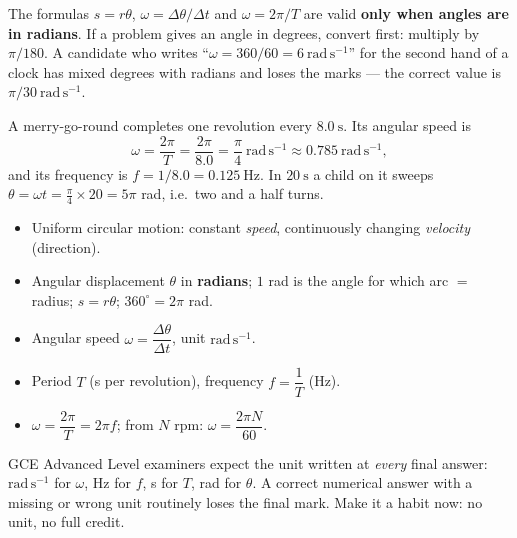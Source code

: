 \documentclass[11pt]{article}
\begin{document}
\begin{attention}
The formulas $s = r\theta$, $\omega = \Delta\theta/\Delta t$ and $\omega = 2\pi/T$ are valid \textbf{only when angles are in radians}. If a problem gives an angle in degrees, convert first: multiply by $\pi/180$. A candidate who writes ``$\omega = 360/60 = 6\ \mathrm{rad\,s^{-1}}$'' for the second hand of a clock has mixed degrees with radians and loses the marks — the correct value is $\pi/30\ \mathrm{rad\,s^{-1}}$.
\end{attention}

\begin{exemplebox}
A merry-go-round completes one revolution every $8.0\ \mathrm{s}$. Its angular speed is
\[
\omega = \frac{2\pi}{T} = \frac{2\pi}{8.0} = \frac{\pi}{4}\ \mathrm{rad\,s^{-1}} \approx 0.785\ \mathrm{rad\,s^{-1}},
\]
and its frequency is $f = 1/8.0 = 0.125\ \mathrm{Hz}$. In $20\ \mathrm{s}$ a child on it sweeps $\theta = \omega t = \frac{\pi}{4}\times 20 = 5\pi$ rad, i.e.\ two and a half turns.
\end{exemplebox}

\begin{aretenir}
\begin{itemize}
\item Uniform circular motion: constant \emph{speed}, continuously changing \emph{velocity} (direction).
\item Angular displacement $\theta$ in \textbf{radians}; $1$ rad is the angle for which arc $=$ radius; $s = r\theta$; $360^{\circ} = 2\pi$ rad.
\item Angular speed $\omega = \dfrac{\Delta\theta}{\Delta t}$, unit $\mathrm{rad\,s^{-1}}$.
\item Period $T$ (s per revolution), frequency $f = \dfrac{1}{T}$ (Hz).
\item $\omega = \dfrac{2\pi}{T} = 2\pi f$; from $N$ rpm: $\omega = \dfrac{2\pi N}{60}$.
\end{itemize}
\end{aretenir}

\begin{methode}
GCE Advanced Level examiners expect the unit written at \emph{every} final answer: $\mathrm{rad\,s^{-1}}$ for $\omega$, Hz for $f$, s for $T$, rad for $\theta$. A correct numerical answer with a missing or wrong unit routinely loses the final mark. Make it a habit now: no unit, no full credit.
\end{methode}
\end{document}
